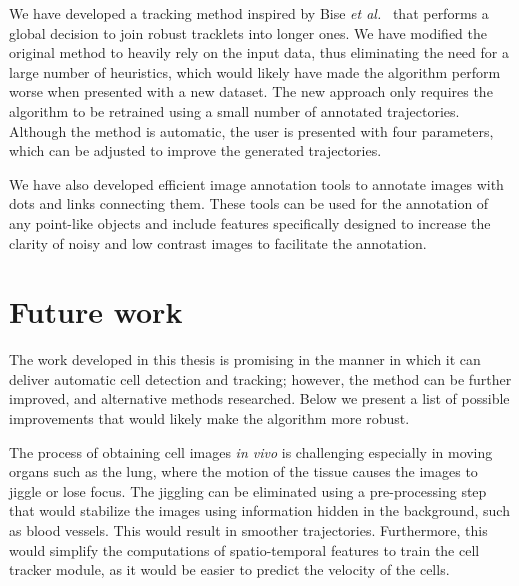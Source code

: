 We have developed a tracking method inspired by Bise \emph{et al.}~\cite{bise11global} that performs a global decision to join robust tracklets into longer ones. We have modified the original method to heavily rely on the input data, thus eliminating the need for a large number of heuristics, which would likely have made the algorithm perform worse when presented with a new dataset. The new approach only requires the algorithm to be retrained using a small number of annotated trajectories. Although the method is automatic, the user is presented with four parameters, which can be adjusted to improve the generated trajectories. 

We have also developed efficient image annotation tools to annotate images with dots and links connecting them. These tools can be used for the annotation of any point-like objects and include features specifically designed to increase the clarity of noisy and low contrast images to facilitate the annotation.



\section{Future work \statusfirstdraft}
\label{sec:conclusion_futurework}

The work developed in this thesis is promising in the manner in which it can deliver automatic cell detection and tracking; however, the method can be further improved, and alternative methods researched. Below we present a list of possible improvements that would likely make the algorithm more robust.

The process of obtaining cell images \textit{in vivo} is challenging especially in moving organs such as the lung, where the motion of the tissue causes the images to jiggle or lose focus. The jiggling can be eliminated using a pre-processing step that would stabilize the images using information hidden in the background, such as blood vessels. This would result in smoother trajectories. Furthermore, this would simplify the computations of spatio-temporal features to train the cell tracker module, as it would be easier to predict the velocity of the cells.

